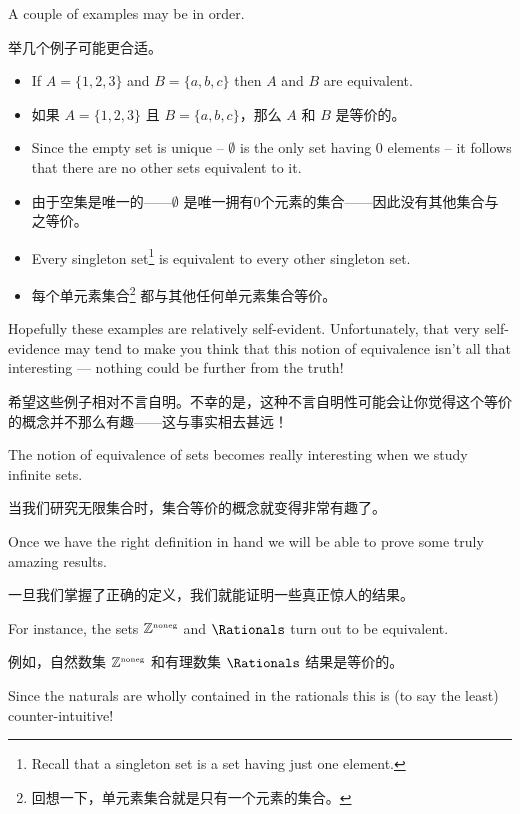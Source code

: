 A couple of examples may be in order.

举几个例子可能更合适。

\begin{itemize}
    \item If $A = \{1, 2, 3\}$ and $B = \{a, b, c\}$ then $A$ and $B$ are equivalent.

    \item 如果 $A = \{1, 2, 3\}$ 且 $B = \{a, b, c\}$，那么 $A$ 和 $B$ 是等价的。

    \item Since the empty set is unique -- $\emptyset$ is the only set having 0 elements -- it
          follows that there are no other sets equivalent to it.

    \item 由于空集是唯一的——$\emptyset$ 是唯一拥有0个元素的集合——因此没有其他集合与之等价。

    \item Every singleton set\footnote{Recall that a
              singleton set is a set having just one element.}
          is equivalent to every other singleton set.

    \item 每个单元素集合\footnote{回想一下，单元素集合就是只有一个元素的集合。}
          都与其他任何单元素集合等价。

\end{itemize}

Hopefully these examples are relatively self-evident.  Unfortunately, that
very self-evidence may tend to make you think that this notion of equivalence
isn't all that interesting ---  nothing could be further from the truth!

希望这些例子相对不言自明。不幸的是，这种不言自明性可能会让你觉得这个等价的概念并不那么有趣——这与事实相去甚远！

The
notion of equivalence of sets becomes really interesting when we study infinite
sets.

当我们研究无限集合时，集合等价的概念就变得非常有趣了。

Once we have the right definition in hand we will be able to prove
some truly amazing results.

一旦我们掌握了正确的定义，我们就能证明一些真正惊人的结果。

For instance, the sets ${\mathbb Z}^{\mbox{\tiny noneg}}$ and $\Rationals$ turn out to be equivalent.

例如，自然数集 ${\mathbb Z}^{\mbox{\tiny noneg}}$ 和有理数集 $\Rationals$ 结果是等价的。

Since the naturals are wholly contained in the rationals this is (to say the least) counter-intuitive!

